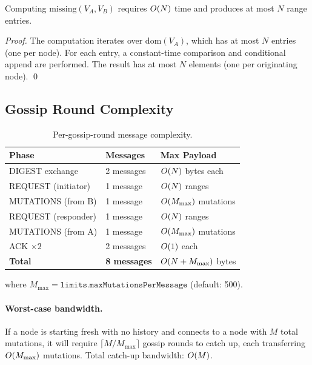 \begin{proposition}
Computing $\mathrm{missing}(V_A, V_B)$ requires $O\!\left(N\right)$ time and produces
at most $N$ range entries.
\end{proposition}

\begin{proof}
The computation iterates over $\mathrm{dom}(V_A)$, which has at most $N$
entries (one per node). For each entry, a constant-time comparison and
conditional append are performed. The result has at most $N$ elements
(one per originating node). \qed
\end{proof}

\subsection{Gossip Round Complexity}

\begin{table}[H]
\centering
\caption{Per-gossip-round message complexity.}
\label{tab:round-complexity}
\begin{tabular}{@{}lll@{}}
\toprule
\textbf{Phase} & \textbf{Messages} & \textbf{Max Payload} \\
\midrule
DIGEST exchange      & 2 messages & $O\!\left(N\right)$ bytes each \\
REQUEST (initiator)  & 1 message  & $O\!\left(N\right)$ ranges \\
MUTATIONS (from B)   & 1 message  & $O\!\left(M_{\max}\right)$ mutations \\
REQUEST (responder)  & 1 message  & $O\!\left(N\right)$ ranges \\
MUTATIONS (from A)   & 1 message  & $O\!\left(M_{\max}\right)$ mutations \\
ACK $\times 2$       & 2 messages & $O\!\left(1\right)$ each \\
\midrule
\textbf{Total}       & \textbf{8 messages} &
  $O\!\left(N + M_{\max}\right)$ bytes \\
\bottomrule
\end{tabular}
\end{table}

where $M_{\max} = \texttt{limits.maxMutationsPerMessage}$ (default: 500).

\paragraph{Worst-case bandwidth.}
If a node is starting fresh with no history and connects to a node with $M$
total mutations, it will require $\lceil M / M_{\max} \rceil$ gossip rounds to
catch up, each transferring $O\!\left(M_{\max}\right)$ mutations. Total catch-up bandwidth:
$O\!\left(M\right)$.

